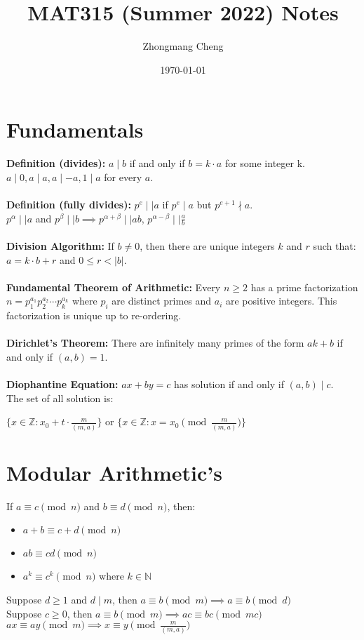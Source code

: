 \documentclass[12pt]{article}
\title{MAT315 (Summer 2022) Notes}
\author{Zhongmang Cheng}
\date{\today}
\begin{document}
\maketitle

\section*{Fundamentals}
\textbf{Definition (divides):} $a\mid b$ if and only if $b=k\cdot a$ for some integer k.\\
$a\mid 0, a\mid a, a\mid -a, 1\mid a$ for every $a$.\\
\\
\textbf{Definition (fully divides):} $p^e\mid\mid a$ if $p^e\mid a$ but $p^{e+1}\nmid a$.\\
$p^\alpha\mid \mid a$ and $p^\beta\mid \mid b \implies p^{\alpha+\beta}\mid\mid ab$, $p^{\alpha-\beta}\mid \mid \frac{a}{b}$\\
\\
\textbf{Division Algorithm:} If $b\neq 0$, then there are unique integers $k$ and $r$ such that:\\$a=k\cdot b+r$ and $0\leq r <|b|$.\\
\\
\textbf{Fundamental Theorem of Arithmetic:} Every $n\geq 2$ has a prime factorization $n=p_1^{a_1}p_2^{a_2}\cdots p_k^{a_k}$ where $p_i$ are distinct primes and $a_i$ are positive integers. This factorization is unique up to re-ordering.\\
\\
\textbf{Dirichlet's Theorem:} There are infinitely many primes of the form $ak+b$ if and only if $(a,b)=1$.\\
\\
\textbf{Diophantine Equation:}
$ax+by=c$ has solution if and only if $(a,b)\mid c$.\\
The set of all solution is:
\begin{center}
    $\{x\in\mathbb{Z}:x_0+t\cdot\frac{m}{(m,a)}\}$
    or $\{x\in\mathbb{Z}:x= x_0\pmod {\frac{m}{(m,a)}}\}$\\
\end{center}


\section*{Modular Arithmetic's}
If $a\equiv c\pmod n$ and $b\equiv d\pmod n$, then:
\begin{itemize}
    \setlength\itemsep{0em}
    \item $a+b\equiv c+d\pmod n$
    \item $ab\equiv cd\pmod n$
    \item $a^k\equiv c^k\pmod n$ where $k\in\mathbb{N}$
\end{itemize}
Suppose $d\geq 1$ and $d\mid m$, then $a\equiv b\pmod m\implies a\equiv b\pmod d$\\
Suppose $c\geq 0$, then $a\equiv b\pmod m\implies ac\equiv bc\pmod {mc}$\\
$ax\equiv ay\pmod m\implies x\equiv y\pmod {\frac{m}{(m,a)}}$\\
\end{document}
